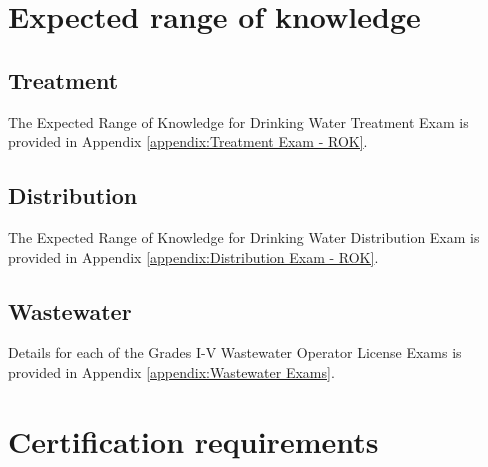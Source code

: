 \section{Expected range of knowledge}
\subsection{Treatment}
The Expected Range of Knowledge for Drinking Water Treatment Exam is provided in Appendix \ref{appendix:Treatment Exam - ROK}.\\
\subsection{Distribution}
The Expected Range of Knowledge for Drinking Water Distribution Exam is provided in Appendix \ref{appendix:Distribution Exam - ROK}.\\
\subsection{Wastewater}
Details for each of the Grades I-V Wastewater Operator License Exams is provided in Appendix \ref{appendix:Wastewater Exams}.\\
\section{Certification requirements}
